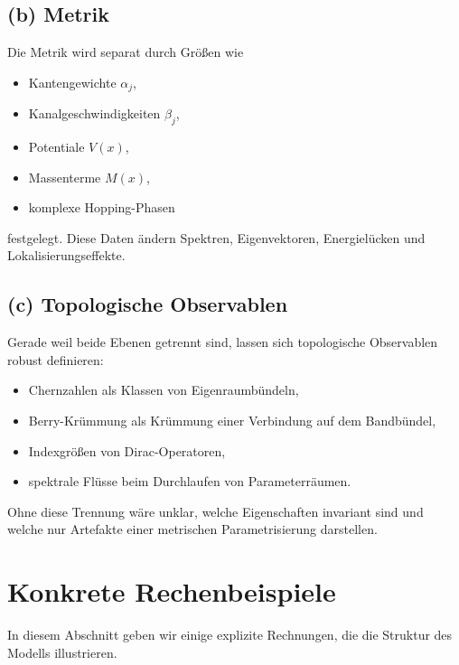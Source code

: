 \documentclass[11pt,a4paper]{article}
\theoremstyle{remark}
\begin{document}
	\subsection*{(b) Metrik}
	Die Metrik wird separat durch Größen wie
	\begin{itemize}
		\item Kantengewichte $\alpha_j$,
		\item Kanalgeschwindigkeiten $\beta_j$,
		\item Potentiale $V(x)$,
		\item Massenterme $M(x)$,
		\item komplexe Hopping-Phasen
	\end{itemize}
	festgelegt.
	Diese Daten ändern Spektren, Eigenvektoren, Energielücken und Lokalisierungseffekte.
	
	\subsection*{(c) Topologische Observablen}
	Gerade weil beide Ebenen getrennt sind, lassen sich topologische Observablen robust definieren:
	\begin{itemize}
		\item Chernzahlen als Klassen von Eigenraumbündeln,
		\item Berry-Krümmung als Krümmung einer Verbindung auf dem Bandbündel,
		\item Indexgrößen von Dirac-Operatoren,
		\item spektrale Flüsse beim Durchlaufen von Parameterräumen.
	\end{itemize}
	Ohne diese Trennung wäre unklar, welche Eigenschaften invariant sind und welche nur Artefakte einer metrischen Parametrisierung darstellen.
	
	\section{Konkrete Rechenbeispiele}
	
	In diesem Abschnitt geben wir einige explizite Rechnungen, die die Struktur des Modells illustrieren.
	
\end{document}
